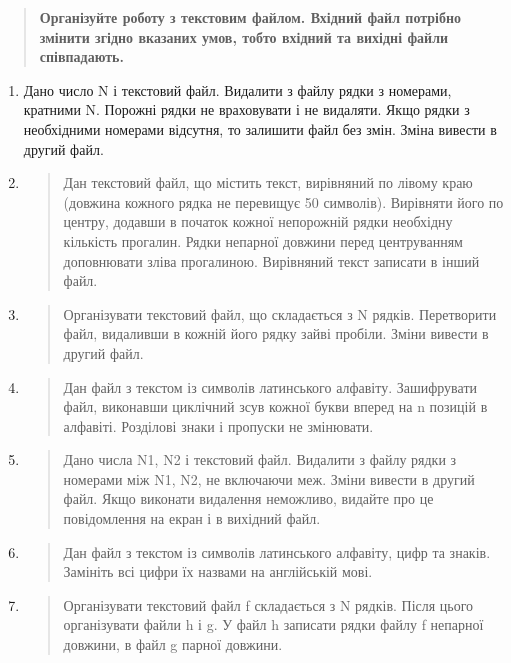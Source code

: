 \documentclass[]{article}
\begin{document}
\begin{quote}
\protect\hypertarget{_Hlk65238644}{}{}\textbf{Організуйте роботу з
текстовим файлом. Вхідний файл потрібно змінити згідно вказаних умов,
тобто вхідний та вихідні файли співпадають.}
\end{quote}

\begin{enumerate}
\def\labelenumi{\arabic{enumi})}
\item
  Дано число N і текстовий файл. Видалити з файлу рядки з номерами,
  кратними N. Порожні рядки не враховувати і не видаляти. Якщо рядки з
  необхідними номерами відсутня, то залишити файл без змін. Зміна
  вивести в другий файл.
\item
  \begin{quote}
  Дан текстовий файл, що містить текст, вирівняний по лівому краю
  (довжина кожного рядка не перевищує 50 символів). Вирівняти його по
  центру, додавши в початок кожної непорожній рядки необхідну кількість
  прогалин. Рядки непарної довжини перед центруванням доповнювати зліва
  прогалиною. Вирівняний текст записати в інший файл.
  \end{quote}
\item
  \begin{quote}
  Організувати текстовий файл, що складається з N рядків. Перетворити
  файл, видаливши в кожній його рядку зайві пробіли. Зміни вивести в
  другий файл.
  \end{quote}
\item
  \begin{quote}
  Дан файл з текстом із символів латинського алфавіту. Зашифрувати файл,
  виконавши циклічний зсув кожної букви вперед на n позицій в алфавіті.
  Розділові знаки і пропуски не змінювати.
  \end{quote}
\item
  \begin{quote}
  Дано числа N1, N2 і текстовий файл. Видалити з файлу рядки з номерами
  між N1, N2, не включаючи меж. Зміни вивести в другий файл. Якщо
  виконати видалення неможливо, видайте про це повідомлення на екран і в
  вихідний файл.
  \end{quote}
\item
  \begin{quote}
  Дан файл з текстом із символів латинського алфавіту, цифр та знаків.
  Замініть всі цифри їх назвами на англійській мові.
  \end{quote}
\item
  \begin{quote}
  Організувати текстовий файл f складається з N рядків. Після цього
  організувати файли h і g. У файл h записати рядки файлу f непарної
  довжини, в файл g парної довжини.
  \end{quote}
\end{enumerate}
\end{document}
